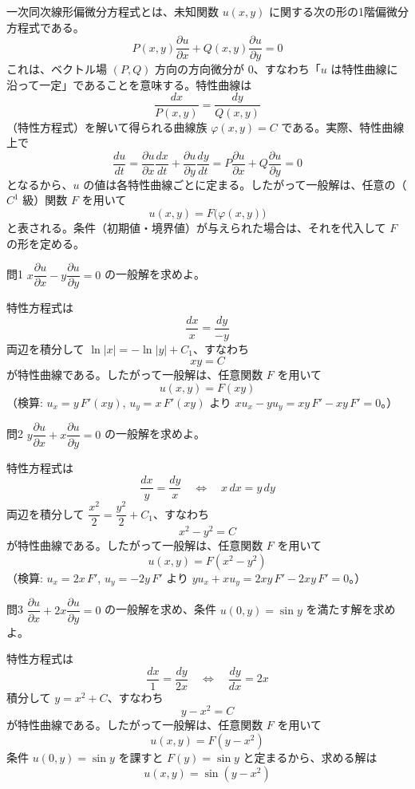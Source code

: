 \documentclass[a4paper,11pt]{article}
\begin{document}


\noindent
一次同次線形偏微分方程式とは、未知関数 $u(x,y)$ に関する次の形の1階偏微分方程式である。
\[
P(x,y)\frac{\partial u}{\partial x} + Q(x,y)\frac{\partial u}{\partial y} = 0
\]
これは、ベクトル場 $(P, Q)$ 方向の方向微分が $0$、すなわち「$u$ は特性曲線に沿って一定」であることを意味する。特性曲線は
\[
\frac{dx}{P(x,y)} = \frac{dy}{Q(x,y)}
\]
（特性方程式）を解いて得られる曲線族 $\varphi(x,y) = C$ である。実際、特性曲線上で
\[
\frac{du}{dt} = \frac{\partial u}{\partial x}\frac{dx}{dt} + \frac{\partial u}{\partial y}\frac{dy}{dt}
= P\frac{\partial u}{\partial x} + Q\frac{\partial u}{\partial y} = 0
\]
となるから、$u$ の値は各特性曲線ごとに定まる。したがって一般解は、任意の（$C^{1}$ 級）関数 $F$ を用いて
\[
u(x,y) = F\bigl(\varphi(x,y)\bigr)
\]
と表される。条件（初期値・境界値）が与えられた場合は、それを代入して $F$ の形を定める。

\clearpage
\begin{mondaiboxS}{問1}
$x\dfrac{\partial u}{\partial x} - y\dfrac{\partial u}{\partial y} = 0$ の一般解を求めよ。
\end{mondaiboxS}
\kaitou
特性方程式は
\[
\frac{dx}{x} = \frac{dy}{-y}
\]
両辺を積分して $\ln|x| = -\ln|y| + C_{1}$、すなわち
\[
xy = C
\]
が特性曲線である。したがって一般解は、任意関数 $F$ を用いて
\[
\boxed{\; u(x,y) = F(xy) \;}
\]
（検算: $u_x = y\,F'(xy)$, $u_y = x\,F'(xy)$ より $x u_x - y u_y = xy\,F' - xy\,F' = 0$。）

\clearpage
\begin{mondaiboxS}{問2}
$y\dfrac{\partial u}{\partial x} + x\dfrac{\partial u}{\partial y} = 0$ の一般解を求めよ。
\end{mondaiboxS}
\kaitou
特性方程式は
\[
\frac{dx}{y} = \frac{dy}{x}
\quad\Longleftrightarrow\quad
x\,dx = y\,dy
\]
両辺を積分して $\dfrac{x^{2}}{2} = \dfrac{y^{2}}{2} + C_{1}$、すなわち
\[
x^{2} - y^{2} = C
\]
が特性曲線である。したがって一般解は、任意関数 $F$ を用いて
\[
\boxed{\; u(x,y) = F(x^{2} - y^{2}) \;}
\]
（検算: $u_x = 2x\,F'$, $u_y = -2y\,F'$ より $y u_x + x u_y = 2xy\,F' - 2xy\,F' = 0$。）

\clearpage
\begin{mondaiboxS}{問3}
$\dfrac{\partial u}{\partial x} + 2x\dfrac{\partial u}{\partial y} = 0$ の一般解を求め、条件 $u(0,y) = \sin y$ を満たす解を求めよ。
\end{mondaiboxS}
\kaitou
特性方程式は
\[
\frac{dx}{1} = \frac{dy}{2x}
\quad\Longleftrightarrow\quad
\frac{dy}{dx} = 2x
\]
積分して $y = x^{2} + C$、すなわち
\[
y - x^{2} = C
\]
が特性曲線である。したがって一般解は、任意関数 $F$ を用いて
\[
u(x,y) = F(y - x^{2})
\]
条件 $u(0,y) = \sin y$ を課すと $F(y) = \sin y$ と定まるから、求める解は
\[
\boxed{\; u(x,y) = \sin\left(y - x^{2}\right) \;}
\]
\end{document}
